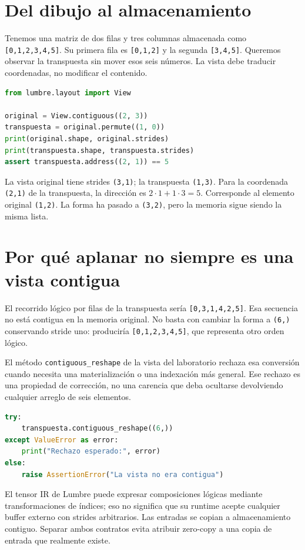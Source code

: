 \documentclass[12pt,a4paper,oneside]{report}
\begin{document}
\section{Del dibujo al almacenamiento}
Tenemos una matriz de dos filas y tres columnas almacenada como \texttt{[0,1,2,3,4,5]}. Su primera fila es \texttt{[0,1,2]} y la segunda \texttt{[3,4,5]}. Queremos observar la transpuesta sin mover esos seis números. La vista debe traducir coordenadas, no modificar el contenido.

\begin{lstlisting}[language=Python]
from lumbre.layout import View

original = View.contiguous((2, 3))
transpuesta = original.permute((1, 0))
print(original.shape, original.strides)
print(transpuesta.shape, transpuesta.strides)
assert transpuesta.address((2, 1)) == 5
\end{lstlisting}
La vista original tiene strides \texttt{(3,1)}; la transpuesta \texttt{(1,3)}. Para la coordenada \texttt{(2,1)} de la transpuesta, la dirección es $2\cdot1+1\cdot3=5$. Corresponde al elemento original \texttt{(1,2)}. La forma ha pasado a \texttt{(3,2)}, pero la memoria sigue siendo la misma lista.

\section{Por qué aplanar no siempre es una vista contigua}
El recorrido lógico por filas de la transpuesta sería \texttt{[0,3,1,4,2,5]}. Esa secuencia no está contigua en la memoria original. No basta con cambiar la forma a \texttt{(6,)} conservando stride uno: produciría \texttt{[0,1,2,3,4,5]}, que representa otro orden lógico.

El método \texttt{contiguous\_reshape} de la vista del laboratorio rechaza esa conversión cuando necesita una materialización o una indexación más general. Ese rechazo es una propiedad de corrección, no una carencia que deba ocultarse devolviendo cualquier arreglo de seis elementos.

\begin{lstlisting}[language=Python]
try:
    transpuesta.contiguous_reshape((6,))
except ValueError as error:
    print("Rechazo esperado:", error)
else:
    raise AssertionError("La vista no era contigua")
\end{lstlisting}
El tensor IR de Lumbre puede expresar composiciones lógicas mediante transformaciones de índices; eso no significa que su runtime acepte cualquier buffer externo con strides arbitrarios. Las entradas se copian a almacenamiento contiguo. Separar ambos contratos evita atribuir zero-copy a una copia de entrada que realmente existe.
\end{document}
